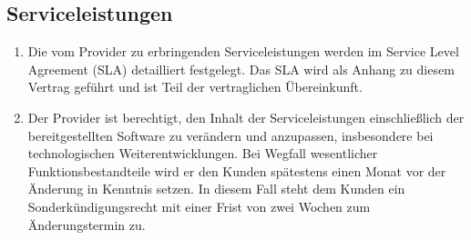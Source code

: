 \documentclass{terms}
\begin{document}
\subsection{Serviceleistungen}
\begin{enumerate}
\item Die vom Provider zu erbringenden Serviceleistungen werden im Service Level Agreement (SLA) detailliert festgelegt.
      Das SLA wird als Anhang zu diesem Vertrag geführt und ist Teil der vertraglichen Übereinkunft.
\item Der Provider ist berechtigt, den Inhalt der Serviceleistungen einschließlich der bereitgestellten Software zu verändern und anzupassen, insbesondere bei technologischen Weiterentwicklungen.
      Bei Wegfall wesentlicher Funktionsbestandteile wird er den Kunden spätestens einen Monat vor der Änderung in Kenntnis setzen.
      In diesem Fall steht dem Kunden ein Sonderkündigungsrecht mit einer Frist von zwei Wochen zum Änderungstermin zu.
\end{enumerate}
\end{document}
